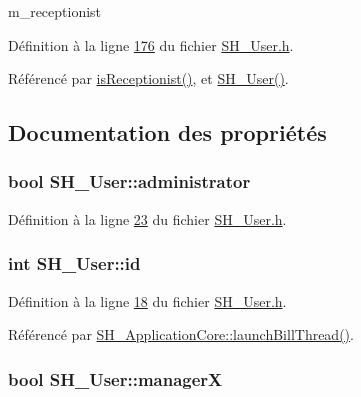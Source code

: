 m\-\_\-receptionist 



Définition à la ligne \hyperlink{SH__User_8h_source_l00176}{176} du fichier \hyperlink{SH__User_8h_source}{S\-H\-\_\-\-User.\-h}.



Référencé par \hyperlink{classSH__User_aa0da8b3326fe98d0ce5ec32e284d8e67}{is\-Receptionist()}, et \hyperlink{classSH__User_a96c0ebb3f11c1654935aaecb92295724}{S\-H\-\_\-\-User()}.



\subsection{Documentation des propriétés}
\hypertarget{classSH__User_ab57f23cf224a8c5bdd191ca501549220}{
\subsubsection[{administrator}]{\setlength{\rightskip}{0pt plus 5cm}bool S\-H\-\_\-\-User\-::administrator\hspace{0.3cm}{\ttfamily [read]}}}\label{classSH__User_ab57f23cf224a8c5bdd191ca501549220}


Définition à la ligne \hyperlink{SH__User_8h_source_l00023}{23} du fichier \hyperlink{SH__User_8h_source}{S\-H\-\_\-\-User.\-h}.

\hypertarget{classSH__User_ad6fb57220df359c4cd28fbd8fcc71b12}{
\subsubsection[{id}]{\setlength{\rightskip}{0pt plus 5cm}int S\-H\-\_\-\-User\-::id\hspace{0.3cm}{\ttfamily [read]}}}\label{classSH__User_ad6fb57220df359c4cd28fbd8fcc71b12}


Définition à la ligne \hyperlink{SH__User_8h_source_l00018}{18} du fichier \hyperlink{SH__User_8h_source}{S\-H\-\_\-\-User.\-h}.



Référencé par \hyperlink{classSH__ApplicationCore_a17a048025bc51a96663029e58c722741}{S\-H\-\_\-\-Application\-Core\-::launch\-Bill\-Thread()}.

\hypertarget{classSH__User_a1794a1229076bcaf2de708146db574b3}{
\subsubsection[{manager\-X}]{\setlength{\rightskip}{0pt plus 5cm}bool S\-H\-\_\-\-User\-::manager\-X\hspace{0.3cm}{\ttfamily [read]}}}\label{classSH__User_a1794a1229076bcaf2de708146db574b3}


